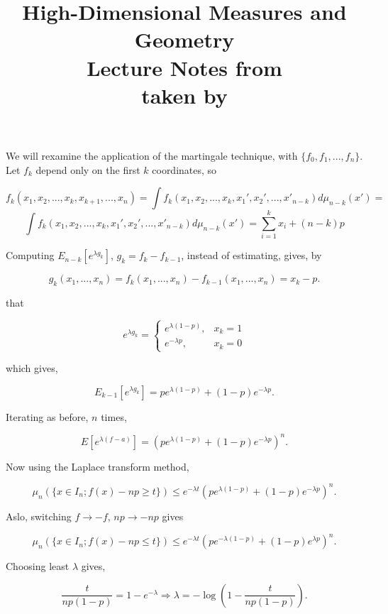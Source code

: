 \documentclass[12pt]{article}
\date{} %
\author{} %
\title{{\bf High-Dimensional Measures and Geometry}\\
Lecture Notes from \lecdat\\[0.1cm] \small taken by \notesby}
\theoremstyle{remark}
\newcommand{\rimply}[0] { \Rightarrow }
\newcommand{\rarw}[0] { \rightarrow }
\begin{document}
\maketitle



We will rexamine the application of the martingale technique, with $\{ f_0, f_1, ..., f_n \}$. \\

Let $f_k$ depend only on the first $k$ coordinates, so

$$
    f_k(x_1, x_2, ..., x_k, x_{k+1}, ..., x_n) = \int f_k(x_1, x_2, ..., x_k, x_1', x_2', ..., x'_{n-k}) d\mu_{n-k}(x') = 
$$
$$ 
     \int f_k(x_1, x_2, ..., x_k, x_1', x_2', ..., x'_{n-k}) d\mu_{n-k}(x') = \sum_{i=1}^k x_i + (n-k) p
$$

Computing $E_{n-k} [ e^{\lambda g_k} ]$, $g_k = f_k - f_{k-1}$, instead of estimating, gives, by

$$
    g_k(x_1, ..., x_n) = f_k(x_1, ..., x_n) - f_{k-1}( x_1, ..., x_n) = x_k - p.
$$

that

\begin{displaymath}
   e^{\lambda g_k} = \left\{
     \begin{array}{lr}
       e^{\lambda(1-p)}, &  x_k=1\\
       e^{-\lambda p}, &  x_k = 0
     \end{array}
   \right.
\end{displaymath} 

which gives,

$$
    E_{k-1} [ e^{\lambda g_k} ] = p e^{\lambda (1-p)} + (1-p) e^{- \lambda p }.
$$

Iterating as before, $n$ times,

$$
    E[ e^{\lambda ( f - a)} ] = \left( p e^{\lambda (1-p)} + (1-p) e^{- \lambda p } \right)^n.
$$


Now using the Laplace transform method,

$$
\mu_n( \{  x \in I_n; f(x) - np \ge t \} ) \le e^{-\lambda t}  \left( p e^{\lambda (1-p)} + (1-p) e^{-\lambda p } \right)^n.
$$

Aslo, switching $f \rarw -f$, $np \rarw -np$ gives

$$
\mu_n( \{  x \in I_n; f(x) - np \le t \} ) \le e^{-\lambda t}  \left( p e^{-\lambda (1-p)} + (1-p) e^{\lambda p } \right)^n.
$$

Choosing least $\lambda$ gives,

$$
\frac{t}{np(1-p)} = 1-e^{-\lambda} \rimply \lambda = -\log \left( 1- \frac{t}{np(1-p)} \right).
$$
\end{document}
